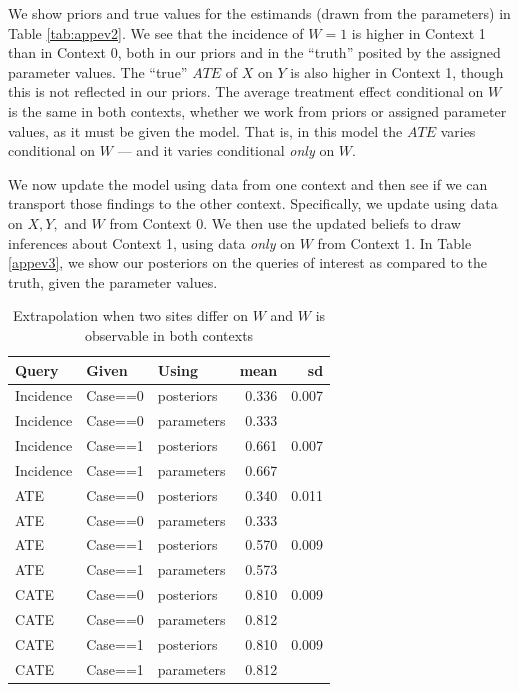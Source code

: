 \documentclass[
  12pt,
]{book}
\begin{document}
We show priors and true values for the estimands (drawn from the parameters) in Table \ref{tab:appev2}. We see that the incidence of \(W=1\) is higher in Context 1 than in Context 0, both in our priors and in the ``truth'' posited by the assigned parameter values. The ``true'' \(ATE\) of \(X\) on \(Y\) is also higher in Context 1, though this is not reflected in our priors. The average treatment effect conditional on \(W\) is the same in both contexts, whether we work from priors or assigned parameter values, as it must be given the model. That is, in this model the \(ATE\) varies conditional on \(W\) --- and it varies conditional \emph{only} on \(W\).

We now update the model using data from one context and then see if we can transport those findings to the other context. Specifically, we update using data on \(X, Y,\) and \(W\) from Context 0. We then use the updated beliefs to draw inferences about Context 1, using data \emph{only} on \(W\) from Context 1. In Table \ref{appev3}, we show our posteriors on the queries of interest as compared to the truth, given the parameter values.

\begin{table}

\caption{\label{tab:appev3}Extrapolation when two sites differ on $W$ and $W$ is observable in both contexts}
\centering
\begin{tabular}[t]{l|l|l|r|r}
\hline
Query & Given & Using & mean & sd\\
\hline
Incidence & Case==0 & posteriors & 0.336 & 0.007\\
\hline
Incidence & Case==0 & parameters & 0.333 & \\
\hline
Incidence & Case==1 & posteriors & 0.661 & 0.007\\
\hline
Incidence & Case==1 & parameters & 0.667 & \\
\hline
ATE & Case==0 & posteriors & 0.340 & 0.011\\
\hline
ATE & Case==0 & parameters & 0.333 & \\
\hline
ATE & Case==1 & posteriors & 0.570 & 0.009\\
\hline
ATE & Case==1 & parameters & 0.573 & \\
\hline
CATE & Case==0 & posteriors & 0.810 & 0.009\\
\hline
CATE & Case==0 & parameters & 0.812 & \\
\hline
CATE & Case==1 & posteriors & 0.810 & 0.009\\
\hline
CATE & Case==1 & parameters & 0.812 & \\
\hline
\end{tabular}
\end{table}
\end{document}
